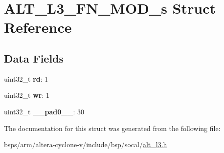 \hypertarget{structALT__L3__FN__MOD__s}{}\section{A\+L\+T\+\_\+\+L3\+\_\+\+F\+N\+\_\+\+M\+O\+D\+\_\+s Struct Reference}
\label{structALT__L3__FN__MOD__s}
\subsection*{Data Fields}
\begin{DoxyCompactItemize}
\item 
\mbox{\label{structALT__L3__FN__MOD__s_a97b37c72ff77492470c365a43fe2805b}} 
uint32\+\_\+t {\bfseries rd}\+: 1
\item 
\mbox{\label{structALT__L3__FN__MOD__s_a56b5eb519daf43e386a30b3408c687b0}} 
uint32\+\_\+t {\bfseries wr}\+: 1
\item 
\mbox{\label{structALT__L3__FN__MOD__s_a9b1a0fb4a4327125187eb96c41b0de20}} 
uint32\+\_\+t {\bfseries \+\_\+\+\_\+pad0\+\_\+\+\_\+}\+: 30
\end{DoxyCompactItemize}


The documentation for this struct was generated from the following file\+:\begin{DoxyCompactItemize}
\item 
bsps/arm/altera-\/cyclone-\/v/include/bsp/socal/\mbox{\hyperlink{alt__l3_8h}{alt\+\_\+l3.\+h}}\end{DoxyCompactItemize}
